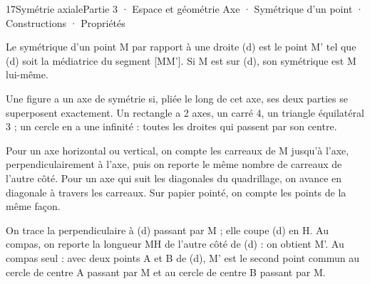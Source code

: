 \begin{ouverture}[geometrie]{17}{Symétrie axiale}{Partie 3 · Espace et géométrie}
{Axe · Symétrique d’un point · Constructions · Propriétés}
\end{ouverture}
\pagestyle{otMain}\essentiel\fontsize{11}{15}\selectfont
{}\label{cours-17-1}
\begin{definition}Le symétrique d’un point M par rapport à une droite (d) est le point M' tel que (d) soit la médiatrice du segment [MM']. Si M est sur (d), son symétrique est M lui-même.\end{definition}
\label{fig-cours-17-1-cours-sym-point}

\begin{definition}Une figure a un axe de symétrie si, pliée le long de cet axe, ses deux parties se superposent exactement. Un rectangle a 2 axes, un carré 4, un triangle équilatéral 3 ; un cercle en a une infinité : toutes les droites qui passent par son centre.\end{definition}
\begin{savoirfaire}Pour un axe horizontal ou vertical, on compte les carreaux de M jusqu’à l’axe, perpendiculairement à l’axe, puis on reporte le même nombre de carreaux de l’autre côté. Pour un axe qui suit les diagonales du quadrillage, on avance en diagonale à travers les carreaux. Sur papier pointé, on compte les points de la même façon.\end{savoirfaire}
\clearpage
{}\label{cours-17-2}
\begin{savoirfaire}On trace la perpendiculaire à (d) passant par M ; elle coupe (d) en H. Au compas, on reporte la longueur MH de l’autre côté de (d) : on obtient M'. Au compas seul : avec deux points A et B de (d), M' est le second point commun au cercle de centre A passant par M et au cercle de centre B passant par M.\end{savoirfaire}
\label{fig-cours-17-2-cours-sym-triangle}

